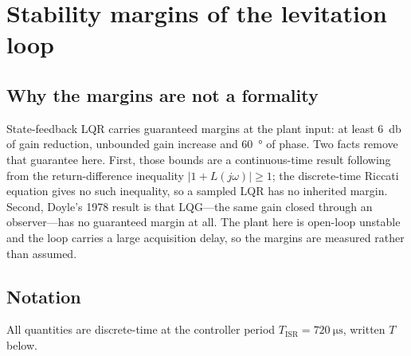 
\section{Stability margins of the levitation loop}
\label{sec:margins}

\subsection{Why the margins are not a formality}

State-feedback LQR carries guaranteed margins at the plant input: at least
\SI{6}{\decibel} of gain reduction, unbounded gain increase and \SI{60}{\degree}
of phase. Two facts remove that guarantee here. First, those bounds are a
continuous-time result following from the return-difference inequality
$|1+L(j\omega)|\ge 1$; the discrete-time Riccati equation gives no such
inequality, so a sampled LQR has no inherited margin. Second, Doyle's 1978
result is that LQG---the same gain closed through an observer---has no
guaranteed margin at all. The plant here is open-loop unstable and the loop
carries a large acquisition delay, so the margins are measured rather than
assumed.

\subsection{Notation}

All quantities are discrete-time at the controller period
$T_{\mathrm{ISR}}=\SI{720}{\micro\second}$, written $T$ below.

